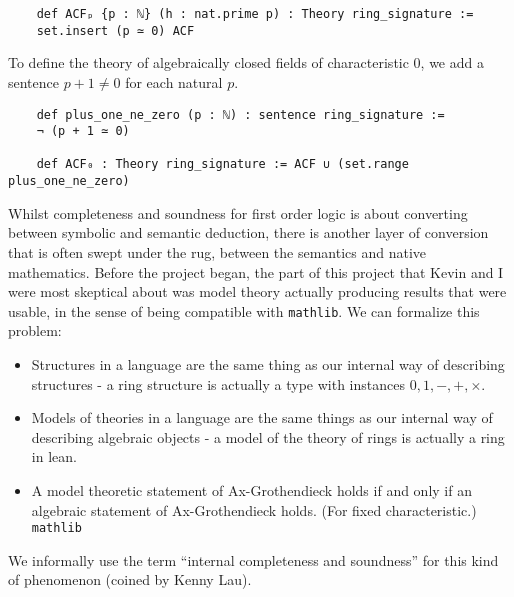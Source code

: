 \begin{dfn}
  \begin{lstlisting}
    def ACFₚ {p : ℕ} (h : nat.prime p) : Theory ring_signature :=
    set.insert (p ≃ 0) ACF\end{lstlisting}

  To define the theory of algebraically closed fields of characteristic $0$,
  we add a sentence $p + 1 \ne 0$ for each natural $p$.

  \begin{lstlisting}
    def plus_one_ne_zero (p : ℕ) : sentence ring_signature :=
    ¬ (p + 1 ≃ 0)

    def ACF₀ : Theory ring_signature := ACF ∪ (set.range plus_one_ne_zero)  \end{lstlisting}

\end{dfn}

  Whilst completeness and soundness for first order logic
  is about converting between symbolic and semantic deduction,
  there is another layer of conversion that is often swept under the rug,
  between the semantics and native mathematics.
  Before the project began,
  the part of this project that Kevin and I were most skeptical about was
  model theory actually producing results that were usable,
  in the sense of being compatible with \texttt{mathlib}.
  We can formalize this problem:

  \begin{itemize}
    \item Structures in a language are the same thing
          as our internal way of describing structures -
          a ring structure is actually a type with instances $0,1,-,+,\times$.
    \item Models of theories in a language are the same things
          as our internal way of describing algebraic objects -
          a model of the theory of rings is actually a ring in lean.
    \item A model theoretic statement of Ax-Grothendieck holds if and only if
          an algebraic statement of Ax-Grothendieck holds.
          (For fixed characteristic.) \texttt{mathlib}
  \end{itemize}

  We informally use the term ``internal completeness and soundness''
  for this kind of phenomenon (coined by Kenny Lau).


